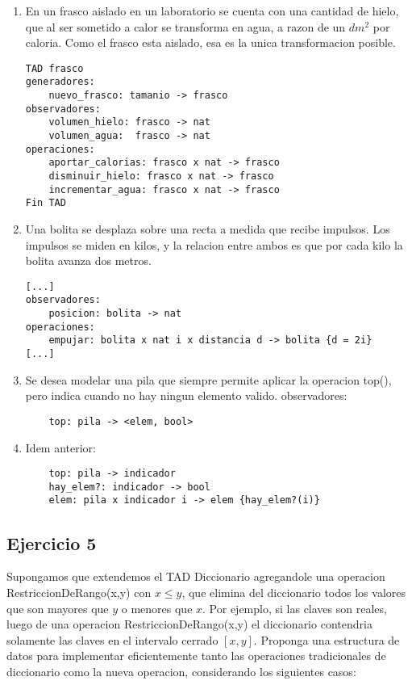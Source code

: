 \documentclass[10pt, a4paper]{article}
\begin{document}
\begin{enumerate}
 \item En un frasco aislado en un laboratorio se cuenta con una cantidad de hielo, que al ser sometido a calor se transforma en agua, a razon de un $dm^2$ por caloria. Como el frasco esta aislado, esa es la unica transformacion posible.

 \begin{verbatim}
TAD frasco
generadores:
    nuevo_frasco: tamanio -> frasco
observadores:
    volumen_hielo: frasco -> nat
    volumen_agua:  frasco -> nat
operaciones:
    aportar_calorias: frasco x nat -> frasco
    disminuir_hielo: frasco x nat -> frasco
    incrementar_agua: frasco x nat -> frasco
Fin TAD
\end{verbatim}

 \item Una bolita se desplaza sobre una recta a medida que recibe impulsos. Los impulsos se miden en kilos, y la relacion entre ambos es que por cada kilo la bolita avanza dos metros.
\begin{verbatim}
[...]
observadores:
    posicion: bolita -> nat
operaciones:
    empujar: bolita x nat i x distancia d -> bolita {d = 2i}
[...]
\end{verbatim}


 \item Se desea modelar una pila que siempre permite aplicar la operacion top(), pero indica cuando no hay ningun elemento valido.
observadores:
\begin{verbatim}
    top: pila -> <elem, bool>
\end{verbatim}

 \item Idem anterior:
\begin{verbatim}
    top: pila -> indicador
    hay_elem?: indicador -> bool
    elem: pila x indicador i -> elem {hay_elem?(i)}
\end{verbatim}

\end{enumerate}

\subsection*{Ejercicio 5}    
Supongamos que extendemos el TAD Diccionario agregandole una operacion RestriccionDeRango(x,y) con $x \leq y$, que elimina del diccionario todos los valores que son mayores que $y$ o menores que $x$. Por ejemplo, si las claves son reales, luego de una operacion RestriccionDeRango(x,y) el diccionario contendria solamente las claves en el intervalo cerrado $[x, y]$. Proponga una estructura de datos para implementar eficientemente tanto las operaciones tradicionales de diccionario como la nueva operacion, considerando los siguientes casos:
\end{document}
